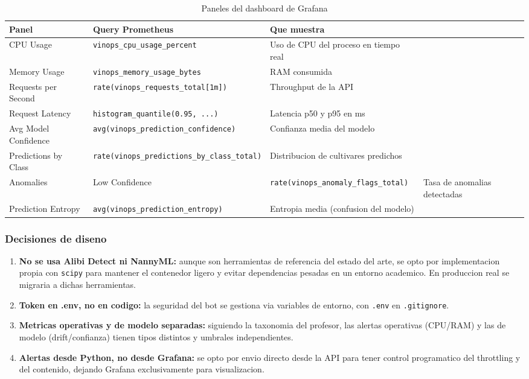 \begin{table}[htbp]
\centering
\caption{Paneles del dashboard de Grafana}
\label{tab:grafana-panels}
\begin{tabular}{@{}llp{5cm}@{}}
\toprule
\textbf{Panel} & \textbf{Query Prometheus} & \textbf{Que muestra} \\
\midrule
CPU Usage & \texttt{vinops\_cpu\_usage\_percent} & Uso de CPU del proceso en tiempo real \\
Memory Usage & \texttt{vinops\_memory\_usage\_bytes} & RAM consumida \\
Requests per Second & \texttt{rate(vinops\_requests\_total[1m])} & Throughput de la API \\
Request Latency & \texttt{histogram\_quantile(0.95, ...)} & Latencia p50 y p95 en ms \\
Avg Model Confidence & \texttt{avg(vinops\_prediction\_confidence)} & Confianza media del modelo \\
Predictions by Class & \texttt{rate(vinops\_predictions\_by\_class\_total)} & Distribucion de cultivares predichos \\
Anomalies & Low Confidence & \texttt{rate(vinops\_anomaly\_flags\_total)} & Tasa de anomalias detectadas \\
Prediction Entropy & \texttt{avg(vinops\_prediction\_entropy)} & Entropia media (confusion del modelo) \\
\bottomrule
\end{tabular}
\end{table}

\subsubsection{Decisiones de diseno}

\begin{enumerate}
    \item \textbf{No se usa Alibi Detect ni NannyML:} aunque son herramientas de referencia del estado del arte, se opto por implementacion propia con \texttt{scipy} para mantener el contenedor ligero y evitar dependencias pesadas en un entorno academico. En produccion real se migraria a dichas herramientas.
    \item \textbf{Token en .env, no en codigo:} la seguridad del bot se gestiona via variables de entorno, con \texttt{.env} en \texttt{.gitignore}.
    \item \textbf{Metricas operativas y de modelo separadas:} siguiendo la taxonomia del profesor, las alertas operativas (CPU/RAM) y las de modelo (drift/confianza) tienen tipos distintos y umbrales independientes.
    \item \textbf{Alertas desde Python, no desde Grafana:} se opto por envio directo desde la API para tener control programatico del throttling y del contenido, dejando Grafana exclusivamente para visualizacion.
\end{enumerate}


